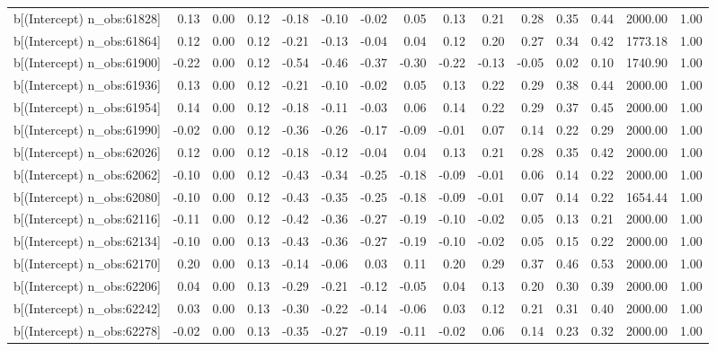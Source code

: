 \begin{table}[ht]
\begin{tabular}{rrrrrrrrrrrrrrr}
  b[(Intercept) n\_obs:61828] & 0.13 & 0.00 & 0.12 & -0.18 & -0.10 & -0.02 & 0.05 & 0.13 & 0.21 & 0.28 & 0.35 & 0.44 & 2000.00 & 1.00 \\ 
  b[(Intercept) n\_obs:61864] & 0.12 & 0.00 & 0.12 & -0.21 & -0.13 & -0.04 & 0.04 & 0.12 & 0.20 & 0.27 & 0.34 & 0.42 & 1773.18 & 1.00 \\ 
  b[(Intercept) n\_obs:61900] & -0.22 & 0.00 & 0.12 & -0.54 & -0.46 & -0.37 & -0.30 & -0.22 & -0.13 & -0.05 & 0.02 & 0.10 & 1740.90 & 1.00 \\ 
  b[(Intercept) n\_obs:61936] & 0.13 & 0.00 & 0.12 & -0.21 & -0.10 & -0.02 & 0.05 & 0.13 & 0.22 & 0.29 & 0.38 & 0.44 & 2000.00 & 1.00 \\ 
  b[(Intercept) n\_obs:61954] & 0.14 & 0.00 & 0.12 & -0.18 & -0.11 & -0.03 & 0.06 & 0.14 & 0.22 & 0.29 & 0.37 & 0.45 & 2000.00 & 1.00 \\ 
  b[(Intercept) n\_obs:61990] & -0.02 & 0.00 & 0.12 & -0.36 & -0.26 & -0.17 & -0.09 & -0.01 & 0.07 & 0.14 & 0.22 & 0.29 & 2000.00 & 1.00 \\ 
  b[(Intercept) n\_obs:62026] & 0.12 & 0.00 & 0.12 & -0.18 & -0.12 & -0.04 & 0.04 & 0.13 & 0.21 & 0.28 & 0.35 & 0.42 & 2000.00 & 1.00 \\ 
  b[(Intercept) n\_obs:62062] & -0.10 & 0.00 & 0.12 & -0.43 & -0.34 & -0.25 & -0.18 & -0.09 & -0.01 & 0.06 & 0.14 & 0.22 & 2000.00 & 1.00 \\ 
  b[(Intercept) n\_obs:62080] & -0.10 & 0.00 & 0.12 & -0.43 & -0.35 & -0.25 & -0.18 & -0.09 & -0.01 & 0.07 & 0.14 & 0.22 & 1654.44 & 1.00 \\ 
  b[(Intercept) n\_obs:62116] & -0.11 & 0.00 & 0.12 & -0.42 & -0.36 & -0.27 & -0.19 & -0.10 & -0.02 & 0.05 & 0.13 & 0.21 & 2000.00 & 1.00 \\ 
  b[(Intercept) n\_obs:62134] & -0.10 & 0.00 & 0.13 & -0.43 & -0.36 & -0.27 & -0.19 & -0.10 & -0.02 & 0.05 & 0.15 & 0.22 & 2000.00 & 1.00 \\ 
  b[(Intercept) n\_obs:62170] & 0.20 & 0.00 & 0.13 & -0.14 & -0.06 & 0.03 & 0.11 & 0.20 & 0.29 & 0.37 & 0.46 & 0.53 & 2000.00 & 1.00 \\ 
  b[(Intercept) n\_obs:62206] & 0.04 & 0.00 & 0.13 & -0.29 & -0.21 & -0.12 & -0.05 & 0.04 & 0.13 & 0.20 & 0.30 & 0.39 & 2000.00 & 1.00 \\ 
  b[(Intercept) n\_obs:62242] & 0.03 & 0.00 & 0.13 & -0.30 & -0.22 & -0.14 & -0.06 & 0.03 & 0.12 & 0.21 & 0.31 & 0.40 & 2000.00 & 1.00 \\ 
  b[(Intercept) n\_obs:62278] & -0.02 & 0.00 & 0.13 & -0.35 & -0.27 & -0.19 & -0.11 & -0.02 & 0.06 & 0.14 & 0.23 & 0.32 & 2000.00 & 1.00 \\ 

\end{tabular}
\end{table}
